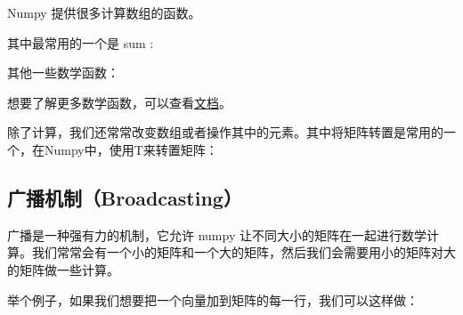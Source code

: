 \begin{frame}


  Numpy 提供很多计算数组的函数。


  其中最常用的一个是 sum :

\end{frame}


\begin{frame}[allowframebreaks]

其他一些数学函数：


想要了解更多数学函数，可以查看\href{http://docs.scipy.org/doc/numpy/reference/routines.math.html}{文档}。

\end{frame}

\begin{frame}



除了计算，我们还常常改变数组或者操作其中的元素。其中将矩阵转置是常用的一个，在Numpy中，使用T来转置矩阵：


\end{frame}
\subsection{广播机制（Broadcasting）}

\begin{frame}





  广播是一种强有力的机制，它允许 numpy 让不同大小的矩阵在一起进行数学计算。我们常常会有一个小的矩阵和一个大的矩阵，然后我们会需要用小的矩阵对大的矩阵做一些计算。

  举个例子，如果我们想要把一个向量加到矩阵的每一行，我们可以这样做：
  
\end{frame}

